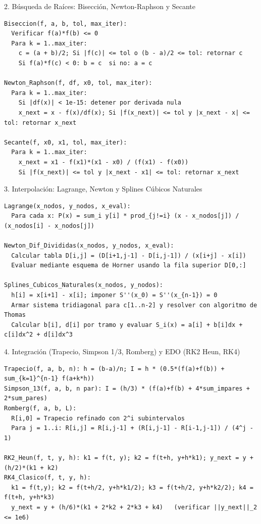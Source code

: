 \documentclass[11pt,a4paper]{article}
\begin{document}
\begin{pseudo}{2. Búsqueda de Raíces: Bisección, Newton-Raphson y Secante}
\begin{verbatim}
Biseccion(f, a, b, tol, max_iter):
  Verificar f(a)*f(b) <= 0
  Para k = 1..max_iter:
    c = (a + b)/2; Si |f(c)| <= tol o (b - a)/2 <= tol: retornar c
    Si f(a)*f(c) < 0: b = c  si no: a = c

Newton_Raphson(f, df, x0, tol, max_iter):
  Para k = 1..max_iter:
    Si |df(x)| < 1e-15: detener por derivada nula
    x_next = x - f(x)/df(x); Si |f(x_next)| <= tol y |x_next - x| <= tol: retornar x_next

Secante(f, x0, x1, tol, max_iter):
  Para k = 1..max_iter:
    x_next = x1 - f(x1)*(x1 - x0) / (f(x1) - f(x0))
    Si |f(x_next)| <= tol y |x_next - x1| <= tol: retornar x_next
\end{verbatim}
\end{pseudo}

\begin{pseudo}{3. Interpolación: Lagrange, Newton y Splines Cúbicos Naturales}
\begin{verbatim}
Lagrange(x_nodos, y_nodos, x_eval):
  Para cada x: P(x) = sum_i y[i] * prod_{j!=i} (x - x_nodos[j]) / (x_nodos[i] - x_nodos[j])

Newton_Dif_Divididas(x_nodos, y_nodos, x_eval):
  Calcular tabla D[i,j] = (D[i+1,j-1] - D[i,j-1]) / (x[i+j] - x[i])
  Evaluar mediante esquema de Horner usando la fila superior D[0,:]

Splines_Cubicos_Naturales(x_nodos, y_nodos):
  h[i] = x[i+1] - x[i]; imponer S''(x_0) = S''(x_{n-1}) = 0
  Armar sistema tridiagonal para c[1..n-2] y resolver con algoritmo de Thomas
  Calcular b[i], d[i] por tramo y evaluar S_i(x) = a[i] + b[i]dx + c[i]dx^2 + d[i]dx^3
\end{verbatim}
\end{pseudo}

\begin{pseudo}{4. Integración (Trapecio, Simpson 1/3, Romberg) y EDO (RK2 Heun, RK4)}
\begin{verbatim}
Trapecio(f, a, b, n): h = (b-a)/n; I = h * (0.5*(f(a)+f(b)) + sum_{k=1}^{n-1} f(a+k*h))
Simpson_13(f, a, b, n par): I = (h/3) * (f(a)+f(b) + 4*sum_impares + 2*sum_pares)
Romberg(f, a, b, L):
  R[i,0] = Trapecio refinado con 2^i subintervalos
  Para j = 1..i: R[i,j] = R[i,j-1] + (R[i,j-1] - R[i-1,j-1]) / (4^j - 1)

RK2_Heun(f, t, y, h): k1 = f(t, y); k2 = f(t+h, y+h*k1); y_next = y + (h/2)*(k1 + k2)
RK4_Clasico(f, t, y, h):
  k1 = f(t,y); k2 = f(t+h/2, y+h*k1/2); k3 = f(t+h/2, y+h*k2/2); k4 = f(t+h, y+h*k3)
  y_next = y + (h/6)*(k1 + 2*k2 + 2*k3 + k4)   (verificar ||y_next||_2 <= 1e6)
\end{verbatim}
\end{pseudo}
\end{document}
